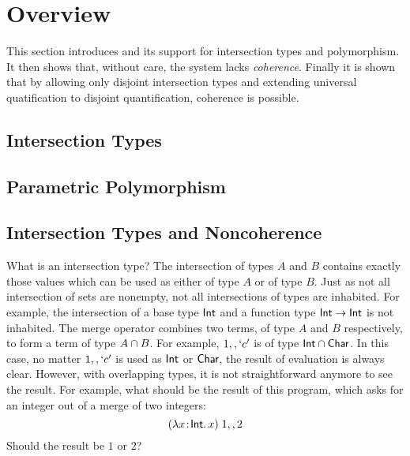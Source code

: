 \section{Overview}

This section introduces \name and its support for intersection types 
and polymorphism. It then shows that, without care, the system 
lacks \emph{coherence}. Finally it is shown that by allowing only 
disjoint intersection types and extending universal quatification to 
disjoint quantification, coherence is possible.

\subsection{Intersection Types}

\subsection{Parametric Polymorphism}

\subsection{Intersection Types and Noncoherence}

What is an intersection type? The intersection of types $A$ and $B$ contains
exactly those values which can be used as either of type $A$ or of type $B$.
Just as not all intersection of sets are nonempty, not all intersections of types are inhabited.
For example, the intersection of a base type $\textsf{Int}$ and a function type $\textsf{Int} \to \textsf{Int}$ is not inhabited.
The merge operator combines two terms, of type $A$ and $B$
respectively, to form a term of type $A \cap B$. For example, $1 ,,
`c'$ is of type $\textsf{Int} \cap \textsf{Char}$. In this case, no matter $1 ,,
`c'$ is used as $\textsf{Int}$ or $\textsf{Char}$, the result of evaluation is always
clear. However, with overlapping types, it is not straightforward anymore to
see the result. For example, what should be the result of this program, which
asks for an integer out of a merge of two integers:
\[ (\lambda x \!:\! \textsf{Int}.\, x) \; 1 ,, 2 \]
Should the result be $1$ or $2$?

